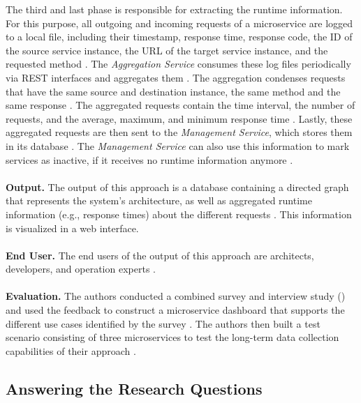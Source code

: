 The third and last phase is responsible for extracting the runtime information.
For this purpose, all outgoing and incoming requests of a microservice are logged to a local file, including their timestamp, response time, response code, the ID of the source service instance, the URL of the target service instance, and the requested method \cite{Mayer2018}.
The \textit{Aggregation Service} consumes these log files periodically via REST interfaces and aggregates them \cite{Mayer2018}.
The aggregation condenses requests that have the same source and destination instance, the same method and the same response \cite{Mayer2018}.
The aggregated requests contain the time interval, the number of requests, and the average, maximum, and minimum response time \cite{Mayer2018}.
Lastly, these aggregated requests are then sent to the \textit{Management Service}, which stores them in its database \cite{Mayer2018}.
The \textit{Management Service} can also use this information to mark services as inactive, if it receives no runtime information anymore \cite{Mayer2018}.
\\ \\
\textbf{Output.}
The output of this approach is a database containing a directed graph that represents the system's architecture, as well as aggregated runtime information (e.g., response times) about the different requests \cite{Mayer2018}.
This information is visualized in a web interface.
\\ \\
\textbf{End User.}
The end users of the output of this approach are architects, developers, and operation experts \cite{Mayer2018}.
\\ \\
\textbf{Evaluation.}
The authors conducted a combined survey and interview study (\cite{Mayer2017dashboard}) and used the feedback to construct a microservice dashboard that supports the different use cases identified by the survey \cite{Mayer2018}.
The authors then built a test scenario consisting of three microservices to test the long-term data collection capabilities of their approach \cite{Mayer2018}.



\subsection{Answering the Research Questions}
\label{sec:Results:AnsweringRQ}

